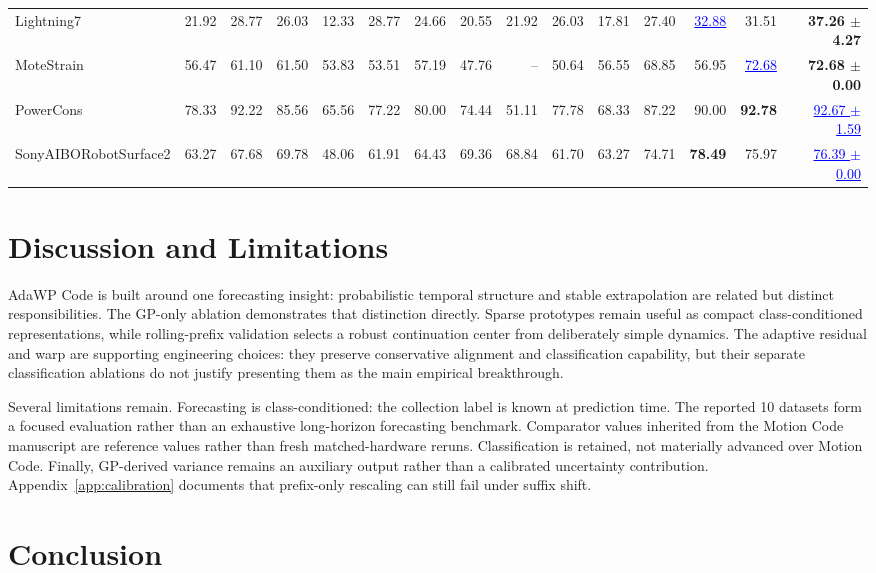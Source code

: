 \documentclass[11pt]{article}
\newcommand{\method}{AdaWP Code}
\newcommand{\mc}{Motion Code}
\newcommand{\best}[1]{\textbf{#1}}
\newcommand{\second}[1]{\textcolor{blue}{\underline{#1}}}
\begin{document}
\begin{table}[H]
{\begin{tabular}{lrrrrrrrrrrrrrr}
Lightning7            & 21.92 & 28.77 & 26.03 & 12.33 & 28.77 & 24.66 & 20.55 & 21.92 & 26.03 & 17.81 & 27.40 & \second{32.88} & 31.51 & \best{37.26 $\pm$ 4.27} \\
MoteStrain            & 56.47 & 61.10 & 61.50 & 53.83 & 53.51 & 57.19 & 47.76 & -- & 50.64 & 56.55 & 68.85 & 56.95 & \second{72.68} & \best{72.68 $\pm$ 0.00} \\
PowerCons             & 78.33 & 92.22 & 85.56 & 65.56 & 77.22 & 80.00 & 74.44 & 51.11 & 77.78 & 68.33 & 87.22 & 90.00 & \best{92.78} & \second{92.67 $\pm$ 1.59} \\
SonyAIBORobotSurface2 & 63.27 & 67.68 & 69.78 & 48.06 & 61.91 & 64.43 & 69.36 & 68.84 & 61.70 & 63.27 & 74.71 & \best{78.49} & 75.97 & \second{76.39 $\pm$ 0.00} \\
\bottomrule
\end{tabular}}
\end{table}

\section{Discussion and Limitations}

\method{} is built around one forecasting insight: probabilistic temporal structure and stable extrapolation are related but distinct responsibilities. The GP-only ablation demonstrates that distinction directly. Sparse prototypes remain useful as compact class-conditioned representations, while rolling-prefix validation selects a robust continuation center from deliberately simple dynamics. The adaptive residual and warp are supporting engineering choices: they preserve conservative alignment and classification capability, but their separate classification ablations do not justify presenting them as the main empirical breakthrough.

Several limitations remain. Forecasting is class-conditioned: the collection label is known at prediction time. The reported 10 datasets form a focused evaluation rather than an exhaustive long-horizon forecasting benchmark. Comparator values inherited from the \mc{} manuscript are reference values rather than fresh matched-hardware reruns. Classification is retained, not materially advanced over \mc{}. Finally, GP-derived variance remains an auxiliary output rather than a calibrated uncertainty contribution. Appendix~\ref{app:calibration} documents that prefix-only rescaling can still fail under suffix shift.

\section{Conclusion}
\end{document}
